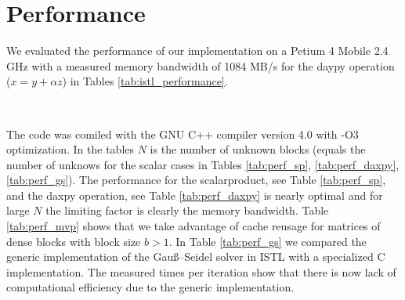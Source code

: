 \documentclass[11pt]{article}
\begin{document}
{\section{Performance}
We evaluated the performance of our implementation on a Petium 4 Mobile
2.4 GHz with a measured memory bandwidth of 1084 MB/s for the daypy
operation ($x = y + \alpha z$) in Tables
\ref{tab:istl_performance}. 
\begin{table}[htb]
  \centering
  \caption{Performance Tests}
  \label{tab:istl_performance}
  \mbox{\small
    }
  \mbox{\small
    }
\end{table}
The code was comiled with the GNU C++ 
compiler version 4.0 with -O3 optimization. In the tables $N$ is the
number of 
unknown blocks (equals the number of unknows for the scalar cases in
Tables \ref{tab:perf_sp}, \ref{tab:perf_daxpy}, \ref{tab:perf_gs}).
The performance for the scalarproduct,
see Table \ref{tab:perf_sp},
and the daxpy operation, see Table \ref{tab:perf_daxpy}  is nearly
optimal and for large $N$ the limiting factor is clearly the memory
bandwidth. Table \ref{tab:perf_mvp} shows that we take advantage of
cache reusage for matrices of dense blocks with block size $b>1$.
In Table
\ref{tab:perf_gs} we compared the generic implementation of
the Gau\ss{}--Seidel solver in ISTL with a specialized C
implementation. The measured times per iteration show that there is
now lack of computational efficiency due to the generic implementation. 

}
\end{document}
